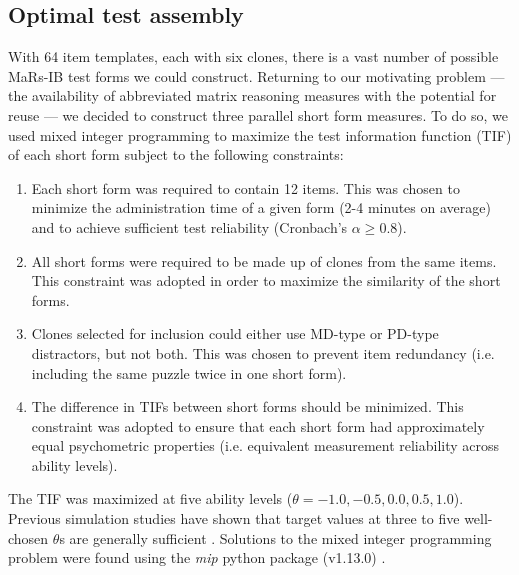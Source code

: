 \documentclass[a4paper,man,natbib]{apa6}
\begin{document}
\subsection{Optimal test assembly}

With 64 item templates, each with six clones, there is a vast number of possible MaRs-IB test forms we could construct. Returning to our motivating problem --- the availability of abbreviated matrix reasoning measures with the potential for reuse --- we decided to construct three parallel short form measures. To do so, we used mixed integer programming \citep{der2005wj} to maximize the test information function (TIF) of each short form subject to the following constraints:

\begin{enumerate}

    \item Each short form was required to contain 12 items. This was chosen to minimize the administration time of a given form (2-4 minutes on average) and to achieve sufficient test reliability (Cronbach's $\alpha \geq 0.8$).
    
    \item All short forms were required to be made up of clones from the same items. This constraint was adopted in order to maximize the similarity of the short forms.
    
    \item Clones selected for inclusion could either use MD-type or PD-type distractors, but not both. This was chosen to prevent item redundancy (i.e. including the same puzzle twice in one short form).
    
    \item The difference in TIFs between short forms should be minimized. This constraint was adopted to ensure that each short form had approximately equal psychometric properties (i.e. equivalent measurement reliability across ability levels). 
    
\end{enumerate}

\noindent The TIF was maximized at five ability levels ($\theta = -1.0, -0.5, 0.0, 0.5, 1.0$). Previous simulation studies have shown that target values at three to five well-chosen $\theta$s are generally sufficient \citep{der2005wj}. Solutions to the mixed integer programming problem were found using the \textit{mip} python package (v1.13.0) \citep{santos2020mixed}.
\end{document}
